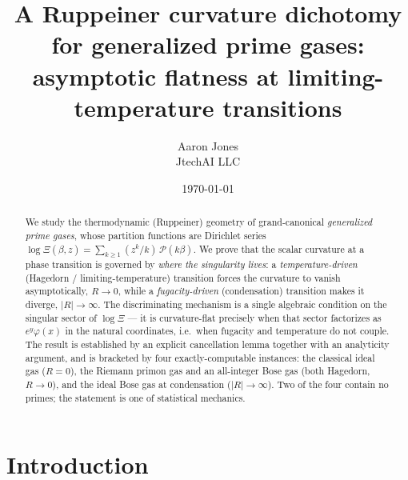 \documentclass[a4paper,11pt]{article}
\title{A Ruppeiner curvature dichotomy for generalized prime gases:\\
       asymptotic flatness at limiting-temperature transitions}
\author{Aaron Jones\\ \small JtechAI LLC}
\date{\today}
\theoremstyle{plain}
\theoremstyle{definition}
\theoremstyle{remark}
\newcommand{\Ric}{R}                 %
\begin{document}
\maketitle

\begin{abstract}
We study the thermodynamic (Ruppeiner) geometry of grand-canonical
\emph{generalized prime gases}, whose partition functions are Dirichlet series
$\log\Xi(\beta,z)=\sum_{k\ge1}(z^k/k)\,\mathcal P(k\beta)$. We prove that the
scalar curvature at a phase transition is governed by \emph{where the singularity
lives}: a \emph{temperature-driven} (Hagedorn / limiting-temperature) transition
forces the curvature to vanish asymptotically, $\Ric\to0$, while a
\emph{fugacity-driven} (condensation) transition makes it diverge, $|\Ric|\to\infty$.
The discriminating mechanism is a single algebraic condition on the singular sector
of $\log\Xi$ --- it is curvature-flat precisely when that sector factorizes as
$e^{y}\varphi(x)$ in the natural coordinates, i.e.\ when fugacity and temperature do
not couple. The result is established by an explicit cancellation lemma together with
an analyticity argument, and is bracketed by four exactly-computable instances: the
classical ideal gas ($\Ric=0$), the Riemann primon gas and an all-integer Bose gas
(both Hagedorn, $\Ric\to0$), and the ideal Bose gas at condensation
($|\Ric|\to\infty$). Two of the four contain no primes; the statement is one of
statistical mechanics.
\end{abstract}

\section{Introduction}\label{sec:intro}
\end{document}
